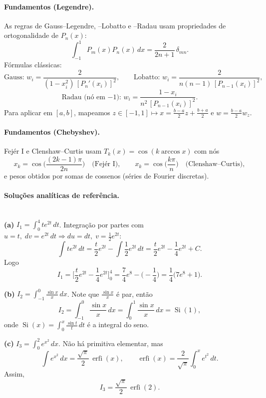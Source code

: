 \documentclass[12pt,a4paper]{article}
\begin{document}
\paragraph{Fundamentos (Legendre).}
As regras de Gauss–Legendre, –Lobatto e –Radau usam propriedades de ortogonalidade de $P_n(x)$:
\[
\int_{-1}^{1} P_m(x)P_n(x)\,dx = \frac{2}{2n+1}\,\delta_{mn}.
\]
Fórmulas clássicas:
\[
\text{Gauss: } w_i = \frac{2}{(1-x_i^2)\,[P_n'(x_i)]^2},\qquad
\text{Lobatto: } w_i = \frac{2}{n(n-1)\,[P_{n-1}(x_i)]^2},
\]
\[
\text{Radau (nó em $-1$): } w_i = \frac{1-x_i}{n^2\,[P_{n-1}(x_i)]^2}.
\]
Para aplicar em $[a,b]$, mapeamos $z\in[-1,1] \mapsto x=\tfrac{b-a}{2}z+\tfrac{b+a}{2}$ e $w=\tfrac{b-a}{2}w_z$.

\paragraph{Fundamentos (Chebyshev).}
Fejér I e Clenshaw–Curtis usam $T_k(x)=\cos(k\arccos x)$ com nós
\[
x_k=\cos\!\Big(\frac{(2k-1)\pi}{2n}\Big) \quad\text{(Fejér I)},\qquad
x_k=\cos\!\Big(\frac{k\pi}{n}\Big) \quad\text{(Clenshaw–Curtis)},
\]
e pesos obtidos por somas de cossenos (séries de Fourier discretas).

\paragraph{Soluções analíticas de referência.}\mbox{}\\

\textbf{(a) } $I_1=\displaystyle\int_0^4 t e^{2t}\,dt$. Integração por partes com
$u=t,\; dv=e^{2t}\,dt\Rightarrow du=dt,\; v=\tfrac{1}{2}e^{2t}$:
\[
\int t e^{2t}\,dt = \frac{t}{2}e^{2t}-\int \frac{1}{2}e^{2t}\,dt
= \frac{t}{2}e^{2t}-\frac{1}{4}e^{2t}+C.
\]
Logo
\[
I_1 = \Big[\frac{t}{2}e^{2t}-\frac{1}{4}e^{2t}\Big]_{0}^{4}
= \frac{7}{4}e^{8}-\Big(-\frac{1}{4}\Big)=\frac{1}{4}\big(7e^{8}+1\big).
\]

\vspace{1cm}

\textbf{(b) } $I_2=\displaystyle\int_{-1}^{0}\frac{\sin x}{x}\,dx$. Note que $\frac{\sin x}{x}$ é par, então
\[
I_2=\int_{-1}^{0}\frac{\sin x}{x}\,dx=\int_{0}^{1}\frac{\sin x}{x}\,dx
=\operatorname{Si}(1),
\]
onde $\operatorname{Si}(x)=\int_0^x \frac{\sin t}{t}\,dt$ é a integral do seno.

\vspace{1cm}

\textbf{(c) } $I_3=\displaystyle\int_{0}^{2}e^{x^2}\,dx$. Não há primitiva elementar, mas
\[
\int e^{x^2}\,dx=\frac{\sqrt{\pi}}{2}\,\operatorname{erfi}(x),\qquad
\operatorname{erfi}(x)=\frac{2}{\sqrt{\pi}}\int_0^x e^{t^2}\,dt.
\]
Assim,
\[
I_3=\frac{\sqrt{\pi}}{2}\,\operatorname{erfi}(2).
\]
\end{document}
